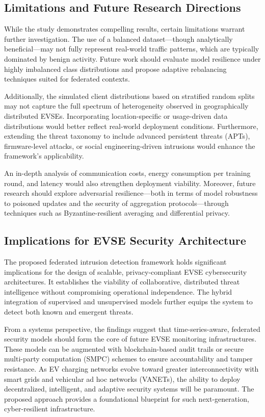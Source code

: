 \subsection{Limitations and Future Research Directions}
While the study demonstrates compelling results, certain limitations warrant further investigation. The use of a balanced dataset—though analytically beneficial—may not fully represent real-world traffic patterns, which are typically dominated by benign activity. Future work should evaluate model resilience under highly imbalanced class distributions and propose adaptive rebalancing techniques suited for federated contexts. 

Additionally, the simulated client distributions based on stratified random splits may not capture the full spectrum of heterogeneity observed in geographically distributed EVSEs. Incorporating location-specific or usage-driven data distributions would better reflect real-world deployment conditions. Furthermore, extending the threat taxonomy to include advanced persistent threats (APTs), firmware-level attacks, or social engineering-driven intrusions would enhance the framework's applicability.

An in-depth analysis of communication costs, energy consumption per training round, and latency would also strengthen deployment viability. Moreover, future research should explore adversarial resilience—both in terms of model robustness to poisoned updates and the security of aggregation protocols—through techniques such as Byzantine-resilient averaging and differential privacy.

\subsection{Implications for EVSE Security Architecture}

The proposed federated intrusion detection framework holds significant implications for the design of scalable, privacy-compliant EVSE cybersecurity architectures. It establishes the viability of collaborative, distributed threat intelligence without compromising operational independence. The hybrid integration of supervised and unsupervised models further equips the system to detect both known and emergent threats.

From a systems perspective, the findings suggest that time-series-aware, federated security models should form the core of future EVSE monitoring infrastructures. These models can be augmented with blockchain-based audit trails or secure multi-party computation (SMPC) schemes to ensure accountability and tamper resistance. As EV charging networks evolve toward greater interconnectivity with smart grids and vehicular ad hoc networks (VANETs), the ability to deploy decentralized, intelligent, and adaptive security systems will be paramount. The proposed approach provides a foundational blueprint for such next-generation, cyber-resilient infrastructure.
